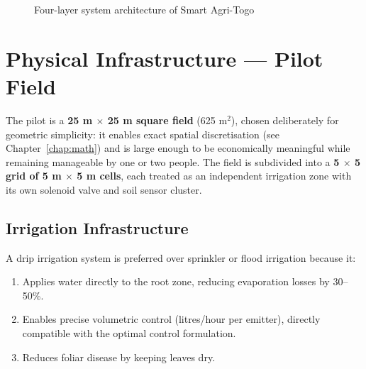 \documentclass[12pt, a4paper]{report}
\begin{document}
\begin{figure}[H]
\caption{Four-layer system architecture of Smart Agri-Togo}
\label{fig:arch}
\end{figure}

\section{Physical Infrastructure — Pilot Field}

The pilot is a \textbf{25 m $\times$ 25 m square field} (625 m$^{2}$), chosen deliberately for geometric simplicity: it enables exact spatial discretisation (see Chapter~\ref{chap:math}) and is large enough to be economically meaningful while remaining manageable by one or two people. The field is subdivided into a \textbf{5 $\times$ 5 grid of 5 m $\times$ 5 m cells}, each treated as an independent irrigation zone with its own solenoid valve and soil sensor cluster.

\subsection{Irrigation Infrastructure}

A drip irrigation system is preferred over sprinkler or flood irrigation because it:
\begin{enumerate}[leftmargin=2em]
  \item Applies water directly to the root zone, reducing evaporation losses by 30–50\%.
  \item Enables precise volumetric control (litres/hour per emitter), directly compatible with the optimal control formulation.
  \item Reduces foliar disease by keeping leaves dry.
\end{enumerate}
\end{document}
